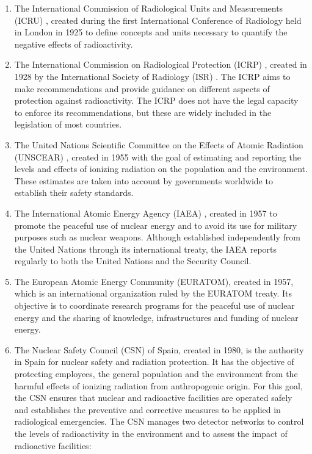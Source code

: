\begin{enumerate}
\item{} The International Commission of Radiological Units and Measurements (ICRU) \cite{ICRU}, created during the first International Conference of Radiology held in London in 1925 to define concepts and units necessary to quantify the negative effects of radioactivity.

\item{} The International Commission on Radiological Protection (ICRP) \cite{ICRP}, created in 1928 by the International Society of Radiology (ISR) \cite{ISR}. The ICRP aims to make recommendations and provide guidance on different aspects of protection against radioactivity. The ICRP does not have the legal capacity to enforce its recommendations, but these are widely included in the legislation of most countries. %

\item{} The United Nations Scientific Committee on the Effects of Atomic Radiation (UNSCEAR) \cite{UNSCEAR}, created in 1955 with the goal of estimating and reporting the levels and effects of ionizing radiation on the population and the environment. These estimates are taken into account by governments worldwide to establish their safety standards.

\item{} The International Atomic Energy Agency (IAEA) \cite{IAEA}, created in 1957 to promote the peaceful use of nuclear energy and to avoid its use for military purposes such as nuclear weapons. Although established independently from the United Nations through its international treaty, the IAEA reports regularly to both the United Nations and the Security Council.

\item{} The European Atomic Energy Community (EURATOM), created in 1957, which is an international organization ruled by the EURATOM treaty. Its objective is to coordinate research programs for the peaceful use of nuclear energy and the sharing of knowledge, infrastructures and funding of nuclear energy.

\item{} The Nuclear Safety Council (CSN) \cite{CSN} of Spain, created in 1980, is the authority in Spain for nuclear safety and radiation protection. It has the objective of protecting employees, the general population and the environment from the harmful effects of ionizing radiation from anthropogenic origin. For this goal, the CSN ensures that nuclear and radioactive facilities are operated safely and establishes the preventive and corrective measures to be applied in radiological emergencies. The CSN manages two detector networks to control the levels of radioactivity in the environment and to assess the impact of radioactive facilities:


\end{enumerate}
